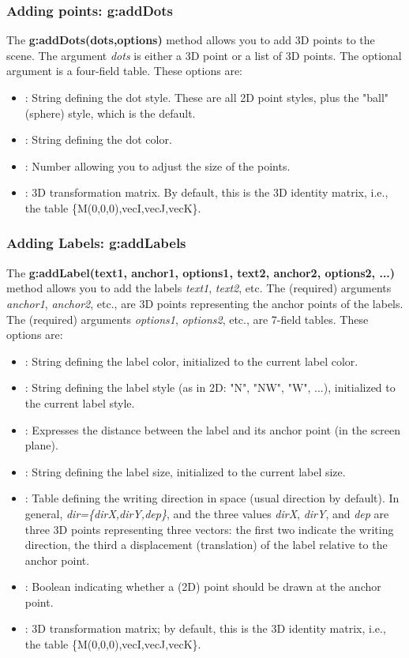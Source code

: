 \subsubsection{Adding points: g:addDots}

The \textbf{g:addDots(dots,options)} method allows you to add 3D points to the scene. The argument \emph{dots} is either a 3D point or a list of 3D points. The optional argument  is a four-field table. These options are:
\begin{itemize}
    \item {}: String defining the dot style. These are all 2D point styles, plus the "ball" (sphere) style, which is the default.
    \item {}: String defining the dot color.
    \item {}: Number allowing you to adjust the size of the points.
    \item {}: 3D transformation matrix. By default, this is the 3D identity matrix, i.e., the table \{M(0,0,0),vecI,vecJ,vecK\}.
\end{itemize}

\subsubsection{Adding Labels: g:addLabels}

The \textbf{g:addLabel(text1, anchor1, options1, text2, anchor2, options2, ...)} method allows you to add the labels \emph{text1}, \emph{text2}, etc. The (required) arguments \emph{anchor1}, \emph{anchor2}, etc., are 3D points representing the anchor points of the labels. The (required) arguments \emph{options1}, \emph{options2}, etc., are 7-field tables. These options are:
\begin{itemize}
    \item {}: String defining the label color, initialized to the current label color.     \item {}: String defining the label style (as in 2D: "N", "NW", "W", ...), initialized to the current label style.
    \item {}: Expresses the distance between the label and its anchor point (in the screen plane).
    \item {}: String defining the label size, initialized to the current label size.
    \item {}: Table defining the writing direction in space (usual direction by default).
In general, \emph{dir=\{dirX,dirY,dep\}}, and the three values ​​\emph{dirX}, \emph{dirY}, and \emph{dep} are three 3D points representing three vectors: the first two indicate the writing direction, the third a displacement (translation) of the label relative to the anchor point.
    \item {}: Boolean indicating whether a (2D) point should be drawn at the anchor point.
    \item {}: 3D transformation matrix; by default, this is the 3D identity matrix, i.e., the table \{M(0,0,0),vecI,vecJ,vecK\}.
\end{itemize}


